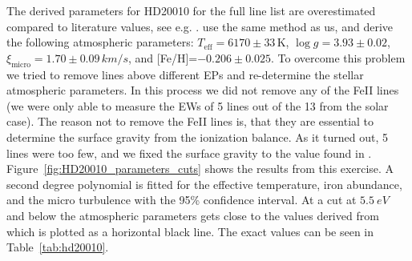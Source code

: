 \documentclass{aa}
\begin{document}
The derived parameters for HD20010 for the full line list
are overestimated compared to literature values, see e.g.
\citet{Mortier2013,Gonzalez2010}. \cite{Gonzalez2010} use the same
method as us, and derive the following atmospheric parameters:
$T_\mathrm{eff}=6170\pm33\,\si{\kelvin}$, $\log g=3.93\pm0.02$,
$\xi_\mathrm{micro}=1.70\pm0.09\,\si{km/s}$, and [Fe/H]=$-0.206\pm0.025$.
To overcome this problem we tried to remove lines above different EPs
and re-determine the stellar atmospheric parameters. In this process
we did not remove any of the FeII lines (we were only able to measure
the EWs of 5 lines out of the 13 from the solar case). The reason not
to remove the FeII lines is, that they are essential to determine the
surface gravity from the ionization balance. As it turned out, 5 lines
were too few, and we fixed the surface gravity to the value found in
\cite{Gonzalez2010}. Figure~\ref{fig:HD20010_parameters_cuts} shows the
results from this exercise. A second degree polynomial is fitted for
the effective temperature, iron abundance, and the micro turbulence
with the 95\% confidence interval. At a cut at $\SI{5.5}{eV}$ and
below the atmospheric parameters gets close to the values derived
from \cite{Gonzalez2010} which is plotted as a horizontal black
line. The exact values can be seen in Table~\ref{tab:hd20010}.
\end{document}
